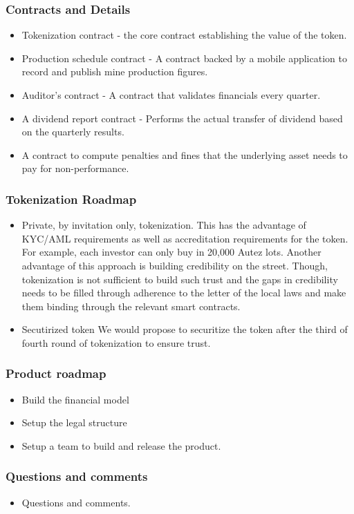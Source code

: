 \documentclass{beamer}
\begin{document}
\begin{frame}
  \frametitle {Contracts and Details}
  \begin{minipage}{\textwidth}
    \begin{itemize}
    \item  Tokenization contract - the core contract establishing the value of the token.
    \item  Production schedule contract - A contract backed by a mobile application to record and publish mine production figures.
    \item  Auditor's contract - A contract that validates financials every quarter.
    \item  A dividend report contract - Performs the actual transfer of dividend based on the quarterly results.
    \item  A contract to compute penalties and fines that the underlying asset needs to pay for non-performance.
    \end{itemize}
  \end{minipage}
\end{frame}

\begin{frame}
  \frametitle {Tokenization Roadmap}
  \begin{minipage}{\textwidth}
    \begin{itemize}
    \item  Private, by invitation only, tokenization. This has the advantage of KYC/AML requirements as well as accreditation requirements for the token.
    For example, each investor can only buy in 20,000 Autez lots. Another advantage of this approach is building credibility on the street. Though, tokenization is not sufficient to build such trust and the gaps in credibility needs to be filled through adherence to the letter of the local laws and make them binding through the relevant smart contracts.
    \item  Secutirized token
      We would propose to securitize the token after the third of fourth round of tokenization to ensure trust.
    \end{itemize}
  \end{minipage}
\end{frame}

\begin{frame}
  \frametitle {Product roadmap}
  \begin{minipage}{\textwidth}
    \begin{itemize}
      \item  Build the financial model
      \item  Setup the legal structure
      \item  Setup a team to build and release the product.
    \end{itemize}
  \end{minipage}
\end{frame}

\begin{frame}
  \frametitle {Questions and comments}
  \begin{minipage}{\textwidth}
    \begin{itemize}
      \item  Questions and comments.
    \end{itemize}
  \end{minipage}
\end{frame}
\end{document}
